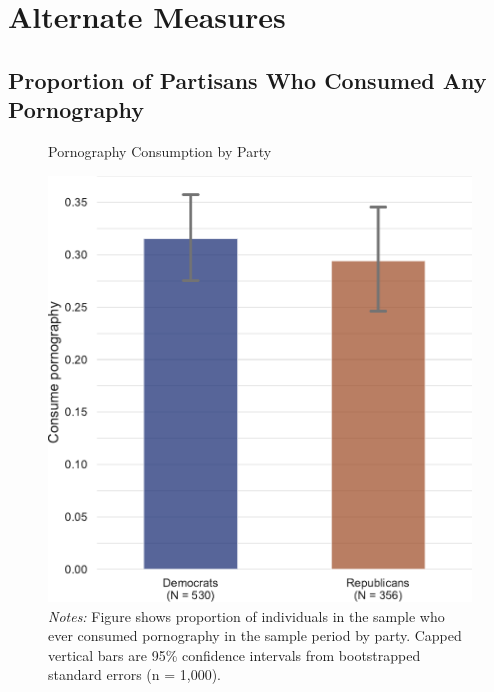 \documentclass[12pt, letterpaper]{article}
\begin{document}
\FloatBarrier
\section{Alternate Measures}

\subsection{Proportion of Partisans Who Consumed Any Pornography}
\begin{figure}
	\centering
	\caption{Pornography Consumption by Party}
	\includegraphics[width=.5\textwidth]{../figs/consume_porn_yes_no.pdf}
	\caption*{\footnotesize \emph{Notes:} 
		Figure shows proportion of individuals in the sample who ever consumed pornography in the sample period by party.
		Capped vertical bars are 95\% confidence intervals from bootstrapped standard errors (n = 1,000).
	}
	\label{fig:consume_porn_yes_no}
\end{figure}
\clearpage

\FloatBarrier
\end{document}
